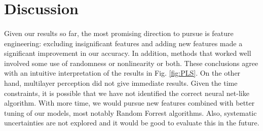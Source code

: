 \documentclass[11pt]{article}
\begin{document}

\section{Discussion}
\paragraph{}
Given our results so far, the most promising direction to pursue is feature engineering: excluding insignificant features and adding new features made a significant improvement in our accuracy. In addition, methods that worked well involved some use of randomness or nonlinearity or both. These conclusions agree with an intuitive interpretation of the results in Fig. \ref{fig:PLS}. On the other hand, multilayer perception did not give immediate results. Given the time constraints, it is possible that we have not identified the correct neural net-like algorithm. With more time, we would pursue new features combined with better tuning of our models, most notably Random Forrest algorithms. Also, systematic uncertainties are not explored and it would be good to evaluate this in the future.
\end{document}
